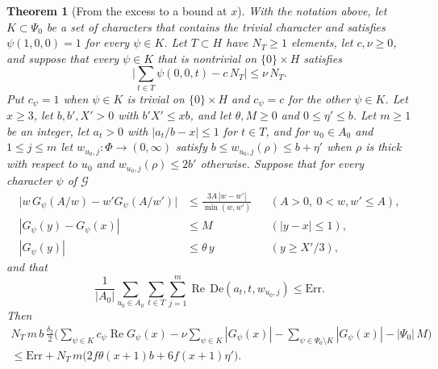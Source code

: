 \documentclass[11pt,letterpaper]{article}
\newtheorem{theorem}{Theorem}[section]
\numberwithin{equation}{section}
\begin{document}
\begin{theorem}[From the excess to a bound at $x$]\label{step5}
With the notation above, let $K\subset\Psi_0$ be a set of characters that contains the trivial character and satisfies $\psi(1,0,0)=1$ for every $\psi\in K$. Let $T\subset H$ have $N_T\ge1$ elements, let $c,\nu\ge0$, and suppose that every $\psi\in K$ that is nontrivial on $\{0\}\times H$ satisfies
\begin{equation}\label{equi}
\Big|\sum_{t\in T}\psi(0,0,t)-c\,N_T\Big|\le\nu\,N_T .
\end{equation}
Put $c_\psi=1$ when $\psi\in K$ is trivial on $\{0\}\times H$ and $c_\psi=c$ for the other $\psi\in K$. Let $x\ge3$, let $b,b',X'>0$ with $b'X'\le xb$, and let $\theta,M\ge0$ and $0\le\eta'\le b$. Let $m\ge1$ be an integer, let $a_t>0$ with $|a_t/b-x|\le1$ for $t\in T$, and for $u_0\in A_0$ and $1\le j\le m$ let $w_{u_0,j}\colon\Phi\to(0,\infty)$ satisfy $b\le w_{u_0,j}(\rho)\le b+\eta'$ when $\rho$ is thick with respect to $u_0$ and $w_{u_0,j}(\rho)\le2b'$ otherwise. Suppose that for every character $\psi$ of $\mathcal G$
\begin{align}
\big|w\,G_\psi(A/w)-w'G_\psi(A/w')\big|&\le\frac{3A\,|w-w'|}{\min(w,w')}&&(A>0,\ 0<w,w'\le A),\label{L1}\\
|G_\psi(y)-G_\psi(x)|&\le M&&(|y-x|\le1),\label{L2}\\
|G_\psi(y)|&\le\theta\,y&&(y\ge X'/3),\label{L3}
\end{align}
and that
\[
\frac1{|A_0|}\sum_{u_0\in A_0}\sum_{t\in T}\sum_{j=1}^m\operatorname{Re}\,\mathrm{De}(a_t,t,w_{u_0,j})\le\mathrm{Err}.
\]
Then
\begin{multline}\label{step5conc}
N_T\,m\,b\,\frac{\delta_2}2\Big(\sum_{\psi\in K}c_\psi\operatorname{Re}G_\psi(x)-\nu\sum_{\psi\in K}|G_\psi(x)|-\sum_{\psi\in\Psi_0\setminus K}|G_\psi(x)|-|\Psi_0|\,M\Big)\\
\le\mathrm{Err}+N_T\,m\Big(2f\theta(x+1)b+6f(x+1)\eta'\Big).
\end{multline}
\end{theorem}
\end{document}
